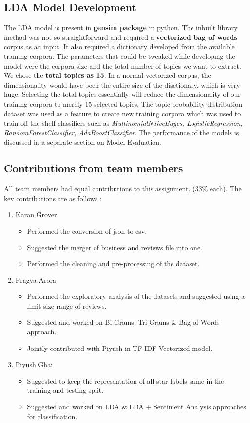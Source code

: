 \documentclass[paper=a4, fontsize=11pt]{scrartcl} %
\numberwithin{equation}{section} %
\numberwithin{figure}{section} %
\numberwithin{table}{section} %
\begin{document}
\subsection{LDA Model Development}
The LDA\cite{lda} model is present in \textbf{gensim package} in python. The inbuilt library method was not so straightforward and required a \textbf{vectorized bag of words} corpus as an input. It also required a dictionary developed from the available training corpora. The parameters that could be tweaked while developing the model were the corpora size and the total number of topics we want to extract. We chose the \textbf{total topics as 15}. In a normal vectorized corpus, the dimensionality would have been the entire size of the disctionary, which is very huge. Selecting the total topics essentially will reduce the dimensionality of our training corpora to merely 15 selected topics. The topic probability distribution dataset was used as a feature to create new training corpora which was used to train off the shelf classifiers such as \textit{MultinomialNaiveBayes, LogisticRegression, RandomForestClassifier, AdaBoostClassifier}. The performance of the models is discussed in a separate section on Model Evaluation.

\subsection{Contributions from team members}
All team members had equal contributions to this assignment. (33\% each). The key contributions are as follows : 
\begin{enumerate}
   \item Karan Grover.
   \begin{itemize}
     \item Performed the conversion of json to csv.
     \item Suggested the merger of business and reviews file into one.
     \item Performed the cleaning and pre-processing of the dataset.
   \end{itemize}
   \item Pragya Arora
   \begin{itemize}
   \item Performed the exploratory analysis of the dataset, and suggested using a limit size range of reviews.
   \item Suggested and worked on Bi-Grams, Tri Grams \& Bag of Words approach.
   \item Jointly contributed with Piyush in TF-IDF Vectorized model.
   \end{itemize}
   \item Piyush Ghai
   \begin{itemize}
   \item Suggested to keep the representation of all star labels same in the training and testing split.
   \item Suggested and worked on LDA \& LDA + Sentiment Analysis approaches for classification.
   \end{itemize}
\end{enumerate}
\end{document}
